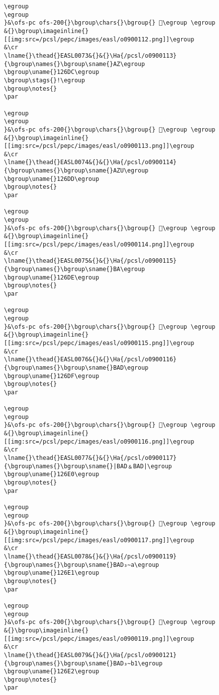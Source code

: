 \begin{verbatim}
\egroup
\egroup
}&\ofs-pc ofs-200{}\bgroup\chars{}\bgroup{} 𒛛\egroup \egroup
&{}\bgroup\imageinline{}[[img:src=/pcsl/pepc/images/easl/o0900112.png]]\egroup
&\cr
\lname{}\thead{}EASL0073&{}&{}\Ha{/pcsl/o0900113}{\bgroup\names{}\bgroup\sname{}AZ\egroup
\bgroup\uname{}126DC\egroup
\bgroup\stags{}!\egroup
\bgroup\notes{}
\par 

\egroup
\egroup
}&\ofs-pc ofs-200{}\bgroup\chars{}\bgroup{} 𒛜\egroup \egroup
&{}\bgroup\imageinline{}[[img:src=/pcsl/pepc/images/easl/o0900113.png]]\egroup
&\cr
\lname{}\thead{}EASL0074&{}&{}\Ha{/pcsl/o0900114}{\bgroup\names{}\bgroup\sname{}AZU\egroup
\bgroup\uname{}126DD\egroup
\bgroup\notes{}
\par 

\egroup
\egroup
}&\ofs-pc ofs-200{}\bgroup\chars{}\bgroup{} 𒛝\egroup \egroup
&{}\bgroup\imageinline{}[[img:src=/pcsl/pepc/images/easl/o0900114.png]]\egroup
&\cr
\lname{}\thead{}EASL0075&{}&{}\Ha{/pcsl/o0900115}{\bgroup\names{}\bgroup\sname{}BA\egroup
\bgroup\uname{}126DE\egroup
\bgroup\notes{}
\par 

\egroup
\egroup
}&\ofs-pc ofs-200{}\bgroup\chars{}\bgroup{} 𒛞\egroup \egroup
&{}\bgroup\imageinline{}[[img:src=/pcsl/pepc/images/easl/o0900115.png]]\egroup
&\cr
\lname{}\thead{}EASL0076&{}&{}\Ha{/pcsl/o0900116}{\bgroup\names{}\bgroup\sname{}BAD\egroup
\bgroup\uname{}126DF\egroup
\bgroup\notes{}
\par 

\egroup
\egroup
}&\ofs-pc ofs-200{}\bgroup\chars{}\bgroup{} 𒛟\egroup \egroup
&{}\bgroup\imageinline{}[[img:src=/pcsl/pepc/images/easl/o0900116.png]]\egroup
&\cr
\lname{}\thead{}EASL0077&{}&{}\Ha{/pcsl/o0900117}{\bgroup\names{}\bgroup\sname{}|BAD﹠BAD|\egroup
\bgroup\uname{}126E0\egroup
\bgroup\notes{}
\par 

\egroup
\egroup
}&\ofs-pc ofs-200{}\bgroup\chars{}\bgroup{} 𒛠\egroup \egroup
&{}\bgroup\imageinline{}[[img:src=/pcsl/pepc/images/easl/o0900117.png]]\egroup
&\cr
\lname{}\thead{}EASL0078&{}&{}\Ha{/pcsl/o0900119}{\bgroup\names{}\bgroup\sname{}BAD₃∼a\egroup
\bgroup\uname{}126E1\egroup
\bgroup\notes{}
\par 

\egroup
\egroup
}&\ofs-pc ofs-200{}\bgroup\chars{}\bgroup{} 𒛡\egroup \egroup
&{}\bgroup\imageinline{}[[img:src=/pcsl/pepc/images/easl/o0900119.png]]\egroup
&\cr
\lname{}\thead{}EASL0079&{}&{}\Ha{/pcsl/o0900121}{\bgroup\names{}\bgroup\sname{}BAD₃∼b1\egroup
\bgroup\uname{}126E2\egroup
\bgroup\notes{}
\par 


\end{verbatim}
